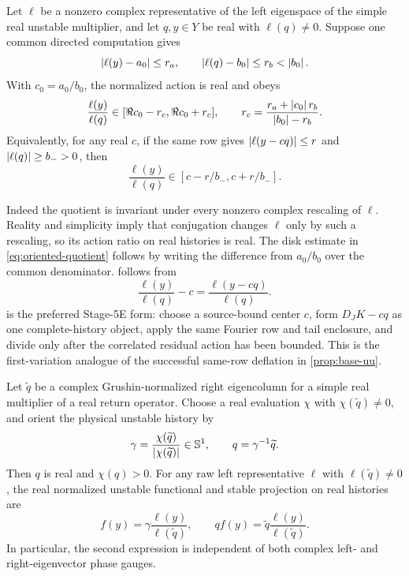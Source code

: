 \begin{lemma}
\label{lem:phase-invariant-quotient}
Let \(\ell\) be a nonzero complex representative of the left eigenspace of
the simple real unstable multiplier, and let \(q,y\in Y\) be real with
\(\ell(q)\ne0\).  Suppose one common directed computation gives
\[
 \left\lvert\ell(y)-a_0\right\rvert\le r_a,
 \qquad \left\lvert\ell(q)-b_0\right\rvert\le r_b<\left\lvert b_0\right\rvert.
\]
With \(c_0=a_0/b_0\), the normalized action is real and obeys
\begin{equation}
 \frac{\ell(y)}{\ell(q)}
 \in[\Re c_0-r_c,\Re c_0+r_c],
 \qquad
 r_c=\frac{r_a+\left\lvert c_0\right\rvert r_b}{\left\lvert b_0\right\rvert-r_b}.          \label{eq:oriented-quotient}
\end{equation}
Equivalently, for any real \(c\), if the same row gives
\(\left\lvert\ell(y-cq)\right\rvert\le r\) and \(\left\lvert\ell(q)\right\rvert\ge b_->0\), then
\begin{equation}
 \frac{\ell(y)}{\ell(q)}
 \in[c-r/b_-,c+r/b_-].                                \label{eq:same-row-residual-quotient}
\end{equation}
\end{lemma}

Indeed the quotient is invariant under every nonzero complex rescaling of
\(\ell\).  Reality and simplicity imply that conjugation changes \(\ell\)
only by such a rescaling, so its action ratio on real histories is real.
The disk estimate in \cref{eq:oriented-quotient} follows by writing the
difference from \(a_0/b_0\) over the common denominator.
 follows from
\[
 \frac{\ell(y)}{\ell(q)}-c
 =\frac{\ell(y-cq)}{\ell(q)}.
\]
 is the preferred Stage-5E form: choose
a source-bound center \(c\), form \(D_JK-cq\) as one complete-history object,
apply the same Fourier row and tail enclosure, and divide only after the
correlated residual action has been bounded.  This is the first-variation
analogue of the successful same-row deflation in
\cref{prop:base-uu}.

\begin{lemma}
\label{lem:right-gauge}
Let \(\widetilde q\) be a complex Grushin-normalized right eigencolumn for a
simple real multiplier of a real return operator.  Choose a real evaluation
\(\chi\) with \(\chi(\widetilde q)\ne0\), and orient the physical unstable
history by
\[
 \gamma=\frac{\chi(\widetilde q)}
               {\left\lvert\chi(\widetilde q)\right\rvert}\in\mathbb S^1,
 \qquad
 q=\gamma^{-1}\widetilde q .
\]
Then \(q\) is real and \(\chi(q)>0\).  For any raw left representative
\(\ell\) with \(\ell(\widetilde q)\ne0\), the real normalized unstable
functional and stable projection on real histories are
\begin{equation}
 f(y)=\gamma\frac{\ell(y)}{\ell(\widetilde q)},
 \qquad
 qf(y)=\widetilde q\frac{\ell(y)}{\ell(\widetilde q)}. \label{eq:right-gauge}
\end{equation}
In particular, the second expression is independent of both complex
left- and right-eigenvector phase gauges.
\end{lemma}

